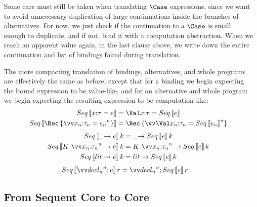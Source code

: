 \documentclass{article}
\begin{document}
Some care must still be taken when translating $\Case$ expressions, since we want
to avoid unnecessary duplication of large continuations inside the branches of
alternatives.  For now, we just check if the continuation to a $\Case$ is small
enough to duplicate, and if not, bind it with a computation abstraction.  When
we reach an apparent value again, in the last clause above, we write down the
entire continuation and list of bindings found during translation.

The more compacting translation of bindings, alternatives, and whole programs
are effectively the same as before, except that for a binding we begin expecting
the bound expression to be value-like, and for an alternative and whole program
we begin expecting the resulting expression to be computation-like:
\begin{align*}
  Seq\trans{\nonrec{\ann x \ty = \expr}}
  &=
  \nonrec{\bindv{\ann x \ty}{Seq\trans{\expr}}}
  \\
  Seq\trans{\rec{\vect[n]{\ann{x_n}{\ty_n} = \expr_n}}}
  &=
  \rec{\vect[n]{\bindv{\ann{x_n}{\ty_n}}{Seq\trans{\expr_n}}}}
\end{align*}
\begin{align*}
  Seq\trans{\blank \to \expr} \ko
  &=
  \blank \to Seq\trans{\expr} \ko
  \\
  Seq\trans{K ~ \vect[n]{\ann{x_n}{\ty_n}} \to \expr} \ko
  &=
  K ~ \vect[n]{\ann{x_n}{\ty_n}}
  \to
  Seq\trans{\expr} \ko
  \\
  Seq\trans{\lit \to \expr} \ko
  &=
  \lit \to Seq\trans{\expr} \ko
\end{align*}
\begin{align*}
  Seq\trans{\vect[n]{\decl_n}; \expr}{r}
  &=
  \vect[n]{\decl_n}; Seq\trans{\expr} r
\end{align*}

\subsection{From Sequent Core to Core}
\end{document}
